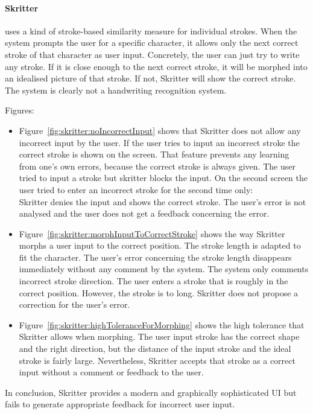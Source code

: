 \paragraph{Skritter} uses a kind of stroke-based similarity measure for 
individual strokes. When the system prompts the user for a specific character,
it allows only the next correct stroke of that character as user input. 
Concretely, the user can just try to write any stroke. If it is close enough to 
the next correct stroke, it will be morphed into an idealised picture of that 
stroke. If not, Skritter will show the correct stroke.
The system is clearly not a handwriting recognition system.

\noindent Figures:
\begin{itemize}
 \item 
 Figure~\ref{fig:skritter:noIncorrectInput} shows that Skritter does not allow
 any incorrect input by the user. If the user tries to input an incorrect stroke
 the correct stroke is shown on the screen. That feature prevents any learning 
 from one's own errors, because the correct stroke is always given.
 The user tried to input a stroke but skritter blocks the input.
 On the second screen the user tried to enter an incorrect stroke for the 
 second time only:\\
 Skritter denies the input and shows the correct stroke.
 The user's error is not analysed and the user does not get a feedback
 concerning the error.

 \item 
 Figure~\ref{fig:skritter:morphInputToCorrectStroke} shows the way Skritter 
 morphs a user input to the correct position. The stroke length is adapted to 
 fit the character. The user's error concerning the stroke length disappears 
 immediately without any comment by the system. The system only comments 
 incorrect stroke direction.
 The user enters a stroke that is roughly in the correct position. However,
 the stroke is to long. Skritter does not propose a correction for the user's 
 error.

 \item 
 Figure~\ref{fig:skritter:highToleranceForMorphing} shows the high tolerance that
 Skritter allows when morphing. The user input stroke has the 
 correct shape and the right  direction, but the distance of the 
 input stroke and the ideal stroke is fairly large. 
 Nevertheless, Skritter accepts that  stroke as a correct input without a 
 comment or feedback to the user.
\end{itemize}
In conclusion, Skritter provides a modern and graphically sophisticated UI but
fails to generate appropriate feedback for incorrect user input.

